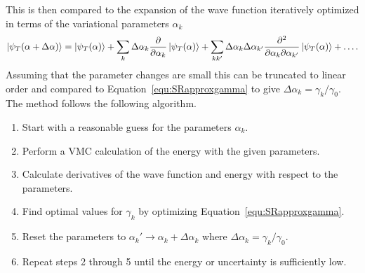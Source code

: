 This is then compared to the expansion of the wave function iteratively optimized in terms of the variational parameters $\alpha_k$
\begin{equation}
   \left| \psi_T(\alpha+\Delta\alpha) \right> = \left| \psi_T(\alpha) \right> + \sum\limits_k \Delta\alpha_k \frac{\partial}{\partial\alpha_k}\left| \psi_T(\alpha) \right> + \sum\limits_{kk'} \Delta\alpha_k\Delta\alpha_{k'} \frac{\partial^2}{\partial\alpha_k\partial\alpha_{k'}}\left| \psi_T(\alpha) \right> + \ldots.
\end{equation}
Assuming that the parameter changes are small this can be truncated to linear order and compared to Equation~\ref{equ:SRapproxgamma} to give $\Delta\alpha_k = \gamma_k/\gamma_0$. The method follows the following algorithm.
\begin{enumerate}
   \item Start with a reasonable guess for the parameters $\alpha_k$.
   \item Perform a VMC calculation of the energy with the given parameters.
   \item Calculate derivatives of the wave function and energy with respect to the parameters.
   \item Find optimal values for $\gamma_k$ by optimizing Equation~\ref{equ:SRapproxgamma}.
   \item Reset the parameters to $\alpha_k' \rightarrow \alpha_k + \Delta\alpha_k$ where $\Delta\alpha_k = \gamma_k/\gamma_0$.
   \item Repeat steps 2 through 5 until the energy or uncertainty is sufficiently low.
\end{enumerate}

